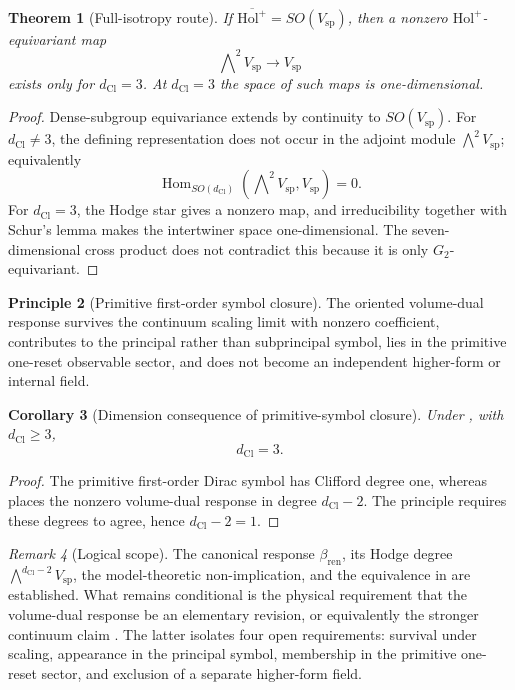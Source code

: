 \documentclass[11pt]{article}
\newtheorem{theorem}{Theorem}[section]
\newtheorem{corollary}[theorem]{Corollary}
\theoremstyle{definition}
\newtheorem{principle}[theorem]{Principle}
\theoremstyle{remark}
\newtheorem{remark}[theorem]{Remark}
\newcommand{\dCl}{d_{\mathrm{Cl}}}
\newcommand{\Hom}{\operatorname{Hom}}
\newcommand{\Vsp}{V_{\mathrm{sp}}}
\newcommand{\Holp}{\mathrm{Hol}^{+}}
\newcommand{\bren}{\beta_{\mathrm{ren}}}
\begin{document}
\begin{theorem}[Full-isotropy route]
\label{thm:full-isotropy-interference}
If \(\overline{\Holp}=SO(\Vsp)\), then a nonzero
\(\Holp\)-equivariant map
\[
  \bigwedge\nolimits^2\Vsp\longrightarrow\Vsp
\]
exists only for \(\dCl=3\). At \(\dCl=3\) the space of such maps is
one-dimensional.
\end{theorem}

\begin{proof}
Dense-subgroup equivariance extends by continuity to \(SO(\Vsp)\). For
\(\dCl\ne3\), the defining representation does not occur in the adjoint module
\(\bigwedge^2\Vsp\); equivalently
\[
  \Hom_{SO(\dCl)}(\bigwedge\nolimits^2\Vsp,\Vsp)=0.
\]
For \(\dCl=3\), the Hodge star gives a nonzero map, and irreducibility together
with Schur's lemma makes the intertwiner space one-dimensional. The
seven-dimensional cross product does not contradict this because it is only
\(G_2\)-equivariant.
\end{proof}

\begin{principle}[Primitive first-order symbol closure]
\label{prin:first-order-symbol-closure}
The oriented volume-dual response survives the continuum scaling limit with
nonzero coefficient, contributes to the principal rather than subprincipal
symbol, lies in the primitive one-reset observable sector, and does not become
an independent higher-form or internal field.
\end{principle}

\begin{corollary}[Dimension consequence of primitive-symbol closure]
\label{cor:first-order-symbol-selects-three}
Under , with \(\dCl\ge3\),
\[
  \boxed{\dCl=3}.
\]
\end{corollary}

\begin{proof}
The primitive first-order Dirac symbol has Clifford degree one, whereas
 places the nonzero volume-dual response in degree
\(\dCl-2\). The principle requires these degrees to agree, hence
\(\dCl-2=1\).
\end{proof}

\begin{remark}[Logical scope]
\label{rem:interference-closure-status}
The canonical response \(\bren\), its Hodge degree
\(\bigwedge^{\dCl-2}\Vsp\), the model-theoretic non-implication, and the
equivalence in  are established.
What remains conditional is the physical requirement that the volume-dual
response be an elementary revision, or equivalently the stronger continuum
claim . The latter isolates four open
requirements: survival under scaling, appearance in the principal symbol,
membership in the primitive one-reset sector, and exclusion of a separate
higher-form field.
\end{remark}
\end{document}
